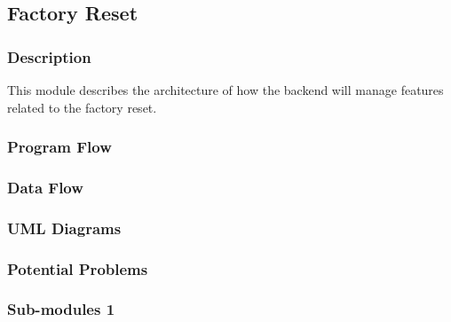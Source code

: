 
\subsection{Factory Reset}

\subsubsection{Description}

This module describes the architecture of how the backend will manage features related to the factory reset.

\subsubsection{Program Flow}


\subsubsection{Data Flow}


\subsubsection{UML Diagrams}


\subsubsection{Potential Problems}


\subsubsection{Sub-modules 1}

